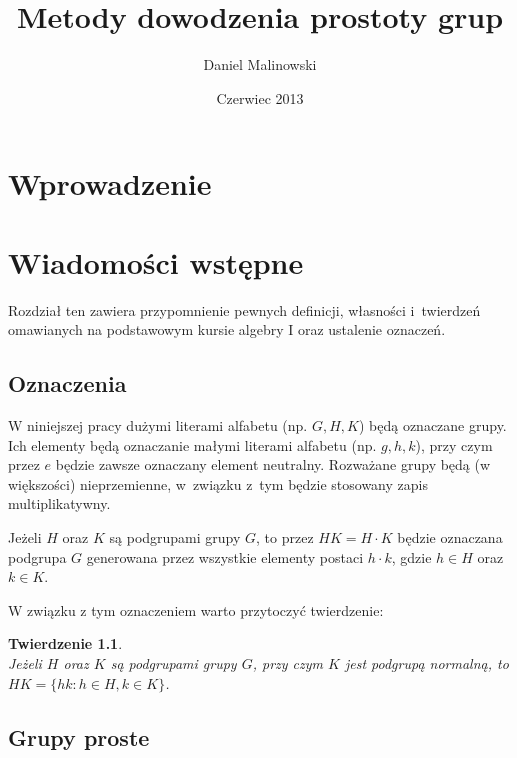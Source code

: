 \documentclass[licencjacka]{pracamgr}
\author{Daniel Malinowski}
\title{Metody dowodzenia prostoty grup}
\date{Czerwiec 2013}
\newtheorem{thh}{Twierdzenie}[section]
\begin{document}
\maketitle

\begin{abstract}
\end{abstract}

\tableofcontents


\chapter*{Wprowadzenie}

\chapter{Wiadomości wstępne}

Rozdział ten zawiera przypomnienie pewnych definicji, własności i~twierdzeń omawianych na podstawowym kursie algebry I
oraz ustalenie oznaczeń.

\section{Oznaczenia}

W niniejszej pracy dużymi literami alfabetu (np. $G, H, K$) będą oznaczane grupy.
Ich elementy będą oznaczanie małymi literami alfabetu (np. $g, h, k$), przy czym przez $e$ będzie zawsze oznaczany element neutralny.
Rozważane grupy będą (w większości) nieprzemienne, w~związku z~tym będzie stosowany zapis multiplikatywny.

Jeżeli $H$ oraz $K$ są podgrupami grupy $G$, to przez $H K = H \cdot K$ będzie oznaczana podgrupa $G$ 
generowana przez wszystkie elementy postaci $h \cdot k$, gdzie $h \in H$ oraz $k \in K$.

W związku z tym oznaczeniem warto przytoczyć twierdzenie:

\begin{thh} \label{mult_groups} $ $ \\
	Jeżeli $H$ oraz $K$ są podgrupami grupy $G$, przy czym $K$ jest podgrupą normalną,
	to $HK = \{ h k \colon h \in H, k \in K\}$.
\end{thh}


\section{Grupy proste}
\end{document}

